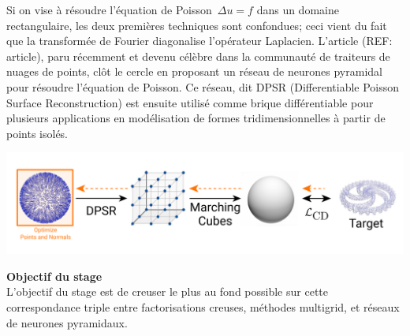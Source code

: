 \documentclass[a4paper,11pt]{article}
\begin{document}
Si on vise à résoudre l'équation de Poisson~$\Delta u = f$ dans un domaine
rectangulaire, les deux premières techniques sont confondues; ceci vient du
fait que la transformée de Fourier diagonalise l'opérateur Laplacien.
L'article (REF: article), paru récemment et devenu célèbre dans la communauté
de traiteurs de nuages de points, clôt le cercle en proposant un réseau
de neurones pyramidal pour résoudre l'équation de Poisson.
Ce réseau, dit DPSR (Differentiable Poisson Surface Reconstruction) est ensuite
utilisé comme brique différentiable pour plusieurs applications en modélisation
de formes tridimensionnelles à partir de points isolés.
\\
\centerline{%
	\includegraphics[width=0.8\linewidth]{f/pipeline_optim.png}%
}



{\bf Objectif du stage}\\
L'objectif du stage est de creuser le plus au fond possible sur cette
correspondance triple entre factorisations creuses, méthodes multigrid, et
réseaux de neurones pyramidaux.


\end{document}
